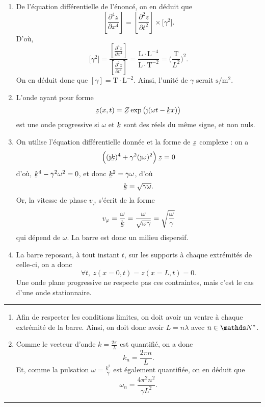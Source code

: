 \documentclass[a4paper]{article}
\begin{document}
\begin{multicols}{2}
\begin{enumerate}[label=({\it\alph*\/})]
			\item De l'équation différentielle de l'énoncé, on en déduit que \[
					\left[ \frac{\partial^4 z}{\partial x^4} \right] = \left[ \frac{\partial^2 z}{\partial t^2} \right] \times \big[\gamma^2\big]
				.\]
				D'où, \[
					\big[\gamma^2\big] = \frac{\left[ \frac{\partial^4 z}{\partial x^4} \right]}{\left[ \frac{\partial^2 z}{\partial t^2}  \right]} = \frac{\mathrm{L} \cdot \mathrm{L}^{-4}}{\mathrm{L} \cdot \mathrm{T}^{-2}} = \Big(\frac{\mathrm{T}}{L^2}\Big)^2
				.\]
				On en déduit donc que $[\gamma] = \mathrm{T} \cdot \mathrm{L}^{-2}$. Ainsi, l'unité de $\gamma$\/ serait $\mathrm{s}/\mathrm{m}^2$.
			\item L'onde ayant pour forme \[
					\ubar{z}(x,t) = \ubar{Z}\exp\big(\mathrm{j}(\omega t - \ubar{k} x)\big)\]
					est une onde progressive si $\omega$\/ et $\ubar{k}$\/ sont des réels du même signe, et non nuls.
				\item On utilise l'équation différentielle donnée et la forme de $\ubar{z}$\/ complexe : on a \[
						\Big((\mathrm{j}\ubar{k})^4 + \gamma^2(\mathrm{j} \omega)^2\Big)\:\ubar{z} = 0
				\] d'où, $\ubar{k}^4 - \gamma^2 \omega ^2 = 0$, et donc $\ubar{k}^2 = \gamma \omega$, d'où \[\ubar{k} = \sqrt{\gamma \omega}.\]
				Or, la vitesse de phase $v_\varphi$\/ s'écrit de la forme
				\[
					v_\varphi = \frac{\omega}{\ubar{k}} = \frac{\omega}{\sqrt{\omega \gamma}} = \sqrt{\frac{\omega}{\gamma}}
				\] qui dépend de $\omega$. La barre est donc un milieu dispersif.
			\item La barre reposant, à tout instant $t$, sur les supports à chaque extrémités de celle-ci, on a donc \[
				\forall t,\:z(x=0,t) = z(x=L, t) = 0
			.\]
			Une onde plane progressive ne respecte pas ces contraintes, mais c'est le cas d'une onde stationnaire.
		\end{enumerate}
		\quad\hrule
		\begin{enumerate}[label=({\it\alph*\/})]
			\item Afin de respecter les conditions limites, on doit avoir un ventre à chaque extrémité de la barre. Ainsi, on doit donc avoir $L = n \lambda$\/ avec $n \in \N^*$.
			\item Comme le vecteur d'onde $k = \frac{2\pi}{\lambda}$ est quantifié, on a donc \[k_n = \frac{2\pi n }{L}.\] Et, comme la pulsation $\omega = \frac{k^2}{\gamma}$ est également quantifiée, on en déduit que \[
				\omega_n = \frac{4\pi^2 n^2}{\gamma L^2}
			.\]
		\end{enumerate}
		\quad\hrule

\end{multicols}
\end{document}
